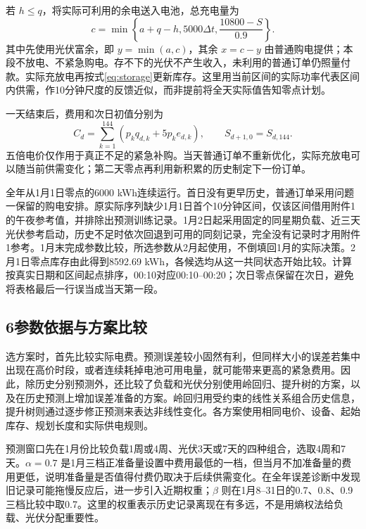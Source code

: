 若 $h\le q$，将实际可利用的余电送入电池，总充电量为
\begin{equation}
c=\min\left\{a+q-h,5000\Delta t,\frac{10800-S}{0.9}\right\}.
\end{equation}
其中先使用光伏富余，即 $y=\min(a,c)$，其余 $x=c-y$ 由普通购电提供；本段不放电、不紧急购电。存不下的光伏不产生收入，未利用的普通订单仍照量付款。实际充放电再按式\eqref{eq:storage}更新库存。这里用当前区间的实际功率代表区间内供需，作10分钟尺度的反馈近似，而非提前将全天实际值告知零点计划。

一天结束后，费用和次日初值分别为
\begin{equation}
C_d=\sum_{k=1}^{144}\left(p_kq_{d,k}+5p_ke_{d,k}\right),\qquad
S_{d+1,0}=S_{d,144}.
\label{eq:bill}
\end{equation}
五倍电价仅作用于真正不足的紧急补购。当天普通订单不重新优化，实际充放电可以随当前供需变化；第二天零点再利用新积累的历史制定下一份订单。

全年从1月1日零点的6000 kWh连续运行。首日没有更早历史，普通订单采用问题一保留的购电安排。原实际序列缺少1月1日首个10分钟区间，仅该区间借用附件1的午夜参考值，并排除出预测训练记录。1月2日起采用固定的同星期负载、近三天光伏参考启动，历史不足时依次回退到可用的同刻记录，完全没有记录时才用附件1参考。1月末完成参数比较，所选参数从2月起使用，不倒填回1月的实际决策。2月1日零点库存由此得到8592.69 kWh，各候选均从这一共同状态开始比较。计算按真实日期和区间起点排序，00:10对应00:10--00:20；次日零点保留在次日，避免将表格最后一行误当成当天第一段。

\subsection*{6\quad 参数依据与方案比较}

选方案时，首先比较实际电费。预测误差较小固然有利，但同样大小的误差若集中出现在高价时段，或者连续耗掉电池可用电量，就可能带来更高的紧急费用。因此，除历史分别预测外，还比较了负载和光伏分别使用岭回归、提升树的方案，以及在历史预测上增加误差准备的方案。岭回归用受约束的线性关系组合历史信息，提升树则通过逐步修正预测来表达非线性变化。各方案使用相同电价、设备、起始库存、规划长度和实际供电规则。

预测窗口先在1月份比较负载1周或4周、光伏3天或7天的四种组合，选取4周和7天。$\alpha=0.7$ 是1月三档正准备量设置中费用最低的一档，但当月不加准备量的费用更低，说明准备量是否值得付费仍取决于后续供需变化。在全年误差诊断中发现旧记录可能拖慢反应后，进一步引入近期权重；$\beta$ 则在1月8--31日的0.7、0.8、0.9三档比较中取0.7。这里的权重表示历史记录离现在有多远，不是用熵权法给负载、光伏分配重要性。

